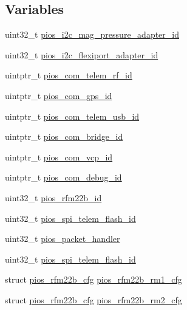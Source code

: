 \subsection*{\-Variables}
\begin{DoxyCompactItemize}
\item 
uint32\-\_\-t \hyperlink{group___revo_mini_ga0bc1cddc7bfac02e5a765f1ff09ad29f}{pios\-\_\-i2c\-\_\-mag\-\_\-pressure\-\_\-adapter\-\_\-id}
\item 
uint32\-\_\-t \hyperlink{group___revo_mini_ga20b68de0b754d943d653d816aad86148}{pios\-\_\-i2c\-\_\-flexiport\-\_\-adapter\-\_\-id}
\item 
uintptr\-\_\-t \hyperlink{group___revo_mini_gae48e848f715b08971e23528feee79339}{pios\-\_\-com\-\_\-telem\-\_\-rf\-\_\-id}
\item 
uintptr\-\_\-t \hyperlink{group___revo_mini_ga05dca72c42c6c2b33fa62b8ee0fcb2ea}{pios\-\_\-com\-\_\-gps\-\_\-id}
\item 
uintptr\-\_\-t \hyperlink{group___revo_mini_ga513cc36d72b76de2fcb75ff233a79a4a}{pios\-\_\-com\-\_\-telem\-\_\-usb\-\_\-id}
\item 
uintptr\-\_\-t \hyperlink{group___revo_mini_gac040f05fa048688ee0269c2768698a14}{pios\-\_\-com\-\_\-bridge\-\_\-id}
\item 
uintptr\-\_\-t \hyperlink{group___revo_mini_gaaeb3e0d65ed5c6e7b921c54e1ad905db}{pios\-\_\-com\-\_\-vcp\-\_\-id}
\item 
uintptr\-\_\-t \hyperlink{group___revo_mini_ga14dc9e3d330b80a37a9699c2112358e0}{pios\-\_\-com\-\_\-debug\-\_\-id}
\item 
uint32\-\_\-t \hyperlink{group___revo_mini_ga1e0b7d2eb8b8640e07daa1f381780972}{pios\-\_\-rfm22b\-\_\-id}
\item 
uint32\-\_\-t \hyperlink{group___revo_mini_gabcea731eedc7b51eae0e4074e35fc8c1}{pios\-\_\-spi\-\_\-telem\-\_\-flash\-\_\-id}
\item 
uint32\-\_\-t \hyperlink{group___revo_mini_gab0199d5aedb7be35cb1d6880ee21f8ac}{pios\-\_\-packet\-\_\-handler}
\item 
uint32\-\_\-t \hyperlink{group___revo_mini_gabcea731eedc7b51eae0e4074e35fc8c1}{pios\-\_\-spi\-\_\-telem\-\_\-flash\-\_\-id}
\item 
struct \hyperlink{structpios__rfm22b__cfg}{pios\-\_\-rfm22b\-\_\-cfg} \hyperlink{group___revo_mini_ga74080000cc730f990607c938f6984f3e}{pios\-\_\-rfm22b\-\_\-rm1\-\_\-cfg}
\item 
struct \hyperlink{structpios__rfm22b__cfg}{pios\-\_\-rfm22b\-\_\-cfg} \hyperlink{group___revo_mini_gacbc9b46e8d0d3813992110ba271f8781}{pios\-\_\-rfm22b\-\_\-rm2\-\_\-cfg}

\end{DoxyCompactItemize}
